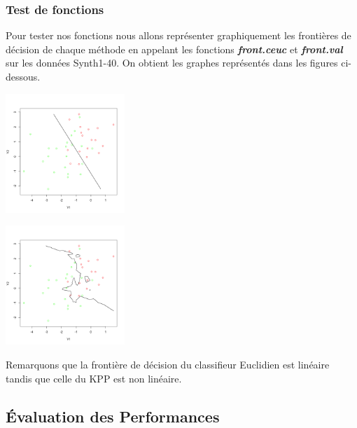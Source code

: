 \documentclass[10pt]{article}
\begin{document}
		\subsubsection{ Test de fonctions}
		Pour tester nos fonctions nous allons représenter graphiquement les frontières de décision de chaque méthode en appelant les fonctions \textbf{\textit{front.ceuc}} et \textbf{\textit{front.val}} sur les données Synth1-40. On obtient les graphes représentés dans les figures ci-dessous.
			\begin{minipage}{.5\textwidth}
			\includegraphics[width=45mm]{Figures/Exo1/front_ceuc.png}
			\label{fig:front_ceuc}
		\end{minipage}%
		\hspace{0.02\linewidth}
		\begin{minipage}{.5\textwidth}
		\includegraphics[width=45mm]{Figures/Exo1/front_kppv.png}
			\label{fig:front_kppv}
		\end{minipage}
		\vspace{0.2mm}
		
		Remarquons que la frontière de décision du classifieur Euclidien est linéaire tandis que celle du KPP est non linéaire.
		
			\subsection{ Évaluation des Performances} \label{section}
			
\end{document}
